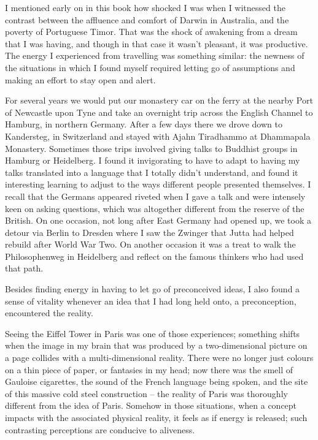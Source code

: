 I mentioned early on in this book how shocked I was when I witnessed the
contrast between the affluence and comfort of Darwin in Australia, and
the poverty of Portuguese Timor. That was the shock of awakening from a
dream that I was having, and though in that case it wasn't pleasant, it
was productive. The energy I experienced from travelling was something
similar: the newness of the situations in which I found myself required
letting go of assumptions and making an effort to stay open and alert.

For several years we would put our monastery car on the ferry at the
nearby Port of Newcastle upon Tyne and take an overnight trip across the
English Channel to Hamburg, in northern Germany. After a few days there
we drove down to Kandersteg, in Switzerland and stayed with Ajahn
Tiradhammo at Dhammapala Monastery. Sometimes those trips involved
giving talks to Buddhist groups in Hamburg or Heidelberg. I found it
invigorating to have to adapt to having my talks translated into a
language that I totally didn't understand, and found it interesting
learning to adjust to the ways different people presented themselves. I
recall that the Germans appeared riveted when I gave a talk and were
intensely keen on asking questions, which was altogether different from
the reserve of the British. On one occasion, not long after East Germany
had opened up, we took a detour via Berlin to Dresden where I saw the
Zwinger\cite{zwinger} that Jutta had helped rebuild after World War Two.
On another occasion it was a treat to walk the Philosophenweg\cite{philosophenweg}
in Heidelberg and reflect on the famous thinkers who had used
that path.

Besides finding energy in having to let go of preconceived ideas, I also
found a sense of vitality whenever an idea that I had long held onto, a
preconception, encountered the reality.

Seeing the Eiffel Tower in Paris was one of those experiences; something
shifts when the image in my brain that was produced by a two-dimensional
picture on a page collides with a multi-dimensional reality. There were
no longer just colours on a thin piece of paper, or fantasies in my
head; now there was the smell of Gauloise cigarettes, the sound of the
French language being spoken, and the site of this massive cold steel
construction -- the reality of Paris was thoroughly different from the
idea of Paris. Somehow in those situations, when a concept impacts with
the associated physical reality, it feels as if energy is released; such
contrasting perceptions are conducive to aliveness.


